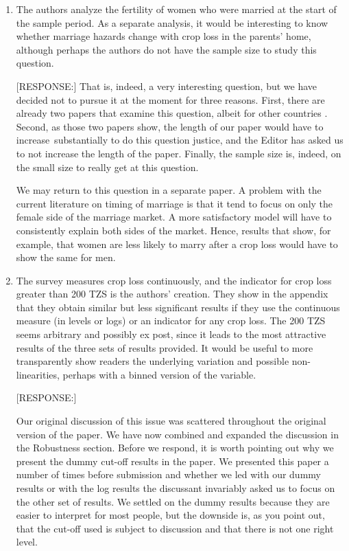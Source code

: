 \documentclass[letterpaper,12pt]{article}
\begin{document}
\begin{enumerate}




\item The authors analyze the fertility of women who were married at the
start of the sample period. As a separate analysis, it would be
interesting to know whether marriage hazards change with crop loss in
the parents' home, although perhaps the authors do not have the sample
size to study this question.

[RESPONSE:] That is, indeed, a very interesting question, but we have 
decided not to pursue it at the moment for three reasons.
First, there are already two papers that examine this question, 
albeit for other countries \citep{mbiti08,Hoogeveen2011}.
Second, as those two papers show, the length of our paper would have
to increase substantially to do this question justice, and the Editor
has asked us to not increase the length of the paper.
Finally, the sample size is, indeed, on the small size to really get 
at this question.

We may return to this question in a separate paper.
A problem with the current literature on timing of marriage
is that it tend to focus on only the female side of the marriage market.
A more satisfactory model will have to consistently explain both sides 
of the market.
Hence, results that show, for example, that women are less likely to
marry after a crop loss would have to show the same for men. 


\item The survey measures crop loss continuously, and the indicator for
crop loss greater than 200 TZS is the authors' creation. They show in
the appendix that they obtain similar but less significant results if
they use the continuous measure (in levels or logs) or an indicator for
any crop loss. The 200 TZS seems arbitrary and possibly ex post, since
it leads to the most attractive results of the three sets of results
provided. It would be useful to more transparently show readers the
underlying variation and possible non-linearities, perhaps with a binned
version of the variable.

[RESPONSE:]

Our original discussion of this issue was scattered throughout the
original version of the paper.
We have now combined and expanded the discussion in the
Robustness section.
Before we respond, it is worth pointing out why we present the dummy
cut-off results in the paper.
We presented this paper a number of times before submission and whether 
we led with our dummy results or with the log results the discussant 
invariably asked us to focus on the other set of results.
We settled on the dummy results because they are easier to interpret 
for most people, but the downside is, as you point out, that the 
cut-off used is subject to discussion and that there is not one right level.


\end{enumerate}
\end{document}
